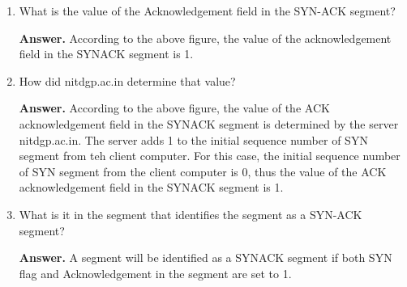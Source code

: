 \documentclass{article}
\begin{document}
\begin{enumerate}
\begin{enumerate}
\item What is the value of the Acknowledgement field in the SYN-ACK segment?

\textbf{Answer.} According to the above figure, the value of the acknowledgement field in the SYNACK segment is 1.

\item How did nitdgp.ac.in determine that value?

\textbf{Answer.} According to the above figure, the value of the ACK acknowledgement field in the SYNACK segment is determined by the server nitdgp.ac.in. The server adds 1 to the initial sequence number of SYN segment from teh client computer. For this case, the initial sequence number of SYN segment from the client computer is 0, thus the value of the ACK acknowledgement field in the SYNACK segment is 1.

\item What is it in the segment that identifies the segment as a SYN-ACK segment?

\textbf{Answer.} A segment will be identified as a SYNACK segment if both SYN flag and Acknowledgement in the segment are set to 1.

\end{enumerate}
\end{enumerate}
\end{document}
